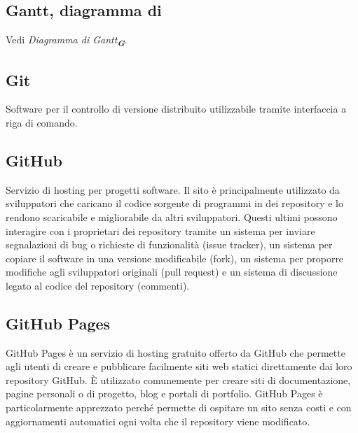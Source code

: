 
\section{}

\subsection*{Gantt, diagramma di}
Vedi \emph{Diagramma di Gantt}\textsubscript{\textit{\textbf{G}}}.

\hypertarget{sec:git}{}
\subsection*{Git}
Software per il controllo di versione distribuito utilizzabile tramite interfaccia a riga di comando.

\subsection*{GitHub}
Servizio di hosting per progetti software. Il sito è principalmente utilizzato da sviluppatori che caricano il codice sorgente di programmi in dei 
repository e lo rendono scaricabile e migliorabile da altri sviluppatori. Questi ultimi possono interagire con i proprietari dei repository tramite un 
sistema per inviare segnalazioni di bug o richieste di funzionalità (issue tracker), un sistema per copiare il software in una versione modificabile 
(fork), un sistema per proporre modifiche agli sviluppatori originali (pull request) e un sistema di discussione legato al codice del repository (commenti).

\subsection*{GitHub Pages}
GitHub Pages è un servizio di hosting gratuito offerto da GitHub che permette agli utenti di creare e pubblicare facilmente siti web statici direttamente 
dai loro repository GitHub. È utilizzato comunemente per creare siti di documentazione, pagine personali o di progetto, blog e portali di portfolio. 
GitHub Pages è particolarmente apprezzato perché permette di ospitare un sito senza costi e con aggiornamenti automatici ogni volta che il repository 
viene modificato.

